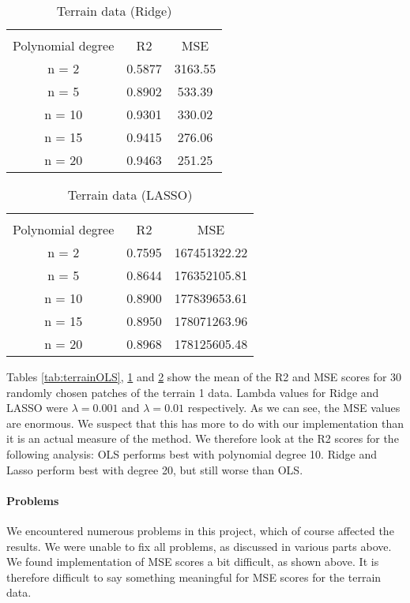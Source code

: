 \documentclass[a4paper]{article}
\begin{document}
\begin{table}[ht]
\caption{Terrain data (Ridge)}
\begin{center}
\begin{tabular}{ccc}
	\hline
	\multicolumn{3}{c}{}\\
	Polynomial degree&R2&MSE\\
	\hline
	n = 2&0.5877&3163.55\\
	n = 5&0.8902&533.39\\
	n = 10&0.9301&330.02\\
	n = 15&0.9415&276.06\\
	n = 20&0.9463&251.25\\
\end{tabular}
\end{center}
\label{tab:terrainRidge}
\end{table}

\begin{table}[ht]
\caption{Terrain data (LASSO)}
\begin{center}
\begin{tabular}{ccc}
	\hline
	\multicolumn{3}{c}{}\\
	Polynomial degree&R2&MSE\\
	\hline
	n = 2&0.7595&167451322.22\\
	n = 5&0.8644&176352105.81\\
	n = 10&0.8900&177839653.61\\
	n = 15&0.8950&178071263.96\\
	n = 20&0.8968&178125605.48\\
\end{tabular}
\end{center}
\label{tab:terrainLASSO}
\end{table}

Tables \ref{tab:terrainOLS}, \ref{tab:terrainRidge} and \ref{tab:terrainLASSO} show the mean of the R2 and MSE scores for 30 randomly chosen patches of the terrain 1 data. Lambda values for Ridge and LASSO were $\lambda = 0.001$ and $\lambda = 0.01$ respectively.
As we can see, the MSE values are enormous. We suspect that this has more to do with our implementation than it is an actual measure of the method. We therefore look at the R2 scores for the following analysis:
OLS performs best with polynomial degree 10. Ridge and Lasso perform best with degree 20, but still worse than OLS.

\paragraph{Problems}
We encountered numerous problems in this project, which of course affected the results. We were unable to fix all problems, as discussed in various parts above.
We found implementation of MSE scores a bit difficult, as shown above. It is therefore difficult to say something meaningful for MSE scores for the terrain data.
\end{document}

